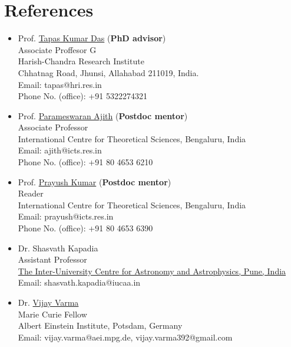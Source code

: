 \documentclass[10pt]{article}
\begin{document}
\section*{References}
\begin{itemize}
\item Prof. \href{http://www.hri.res.in/people/Physics/tapas}{Tapas Kumar Das} ({\bfseries PhD advisor})\\
  Associate Proffesor G\\
  Harish-Chandra Research Institute\\
  Chhatnag Road, Jhunsi, Allahabad 211019, India.\\
  Email: {tapas@hri.res.in}\\
  Phone No. (office): +91 5322274321
  
\item Prof. \href{https://home.icts.res.in/~ajith/Home.html}{Parameswaran Ajith} ({\bfseries Postdoc mentor})\\
  Associate Professor\\
  International Centre for Theoretical Sciences, Bengaluru, India\\
  Email: {ajith@icts.res.in}\\
  Phone No. (office): +91 80 4653 6210

\item Prof. \href{https://www.icts.res.in/people/prayush-kumar-0}{Prayush Kumar} ({\bfseries Postdoc mentor})\\
  Reader\\
  International Centre for Theoretical Sciences, Bengaluru, India\\
  Email: {prayush@icts.res.in}\\
  Phone No. (office): +91 80 4653 6390

\item Dr. {Shasvath Kapadia}\\
  Assistant Professor\\
  \href{https://www.iucaa.in/}{The Inter-University Centre for Astronomy and Astrophysics, Pune, India}\\
  Email: {shasvath.kapadia@iucaa.in}
  
\item Dr. \href{https://vijayvarma.com/}{Vijay Varma}\\
  Marie Curie Fellow\\
  Albert Einstein Institute, Potsdam, Germany\\
  Email: vijay.varma@aei.mpg.de, vijay.varma392@gmail.com

\end{itemize}
\end{document}
